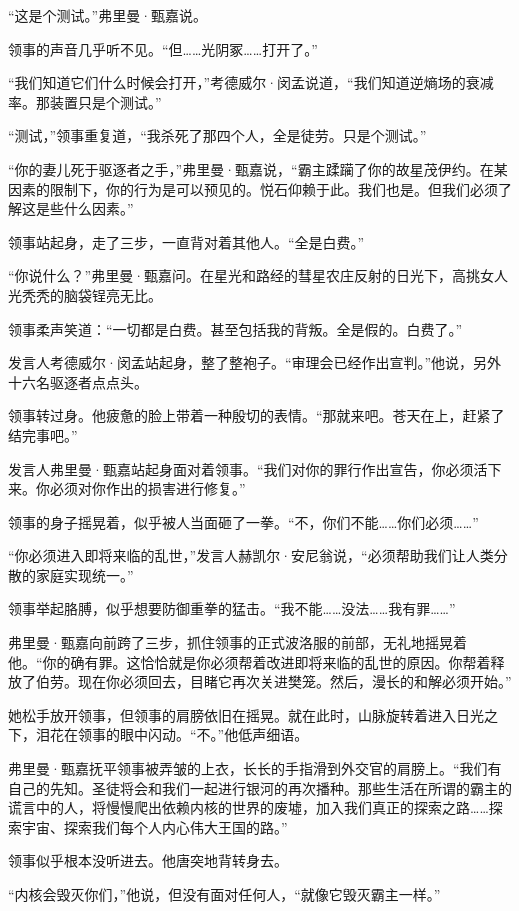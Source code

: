 \documentclass[AutoFakeBold=true]{book}
\begin{document}
``这是个测试。''弗里曼·甄嘉说。

领事的声音几乎听不见。``但……光阴冢……打开了。''

``我们知道它们什么时候会打开，''考德威尔·闵孟说道，``我们知道逆熵场的衰减率。那装置只是个测试。''

``测试，''领事重复道，``我杀死了那四个人，全是徒劳。只是个测试。''

``你的妻儿死于驱逐者之手，''弗里曼·甄嘉说，``霸主蹂躏了你的故星茂伊约。在某因素的限制下，你的行为是可以预见的。悦石仰赖于此。我们也是。但我们必须了解这是些什么因素。''

领事站起身，走了三步，一直背对着其他人。``全是白费。''

``你说什么？''弗里曼·甄嘉问。在星光和路经的彗星农庄反射的日光下，高挑女人光秃秃的脑袋锃亮无比。

领事柔声笑道：``一切都是白费。甚至包括我的背叛。全是假的。白费了。''

发言人考德威尔·闵孟站起身，整了整袍子。``审理会已经作出宣判。''他说，另外十六名驱逐者点点头。

领事转过身。他疲惫的脸上带着一种殷切的表情。``那就来吧。苍天在上，赶紧了结完事吧。''

发言人弗里曼·甄嘉站起身面对着领事。``我们对你的罪行作出宣告，你必须活下来。你必须对你作出的损害进行修复。''

领事的身子摇晃着，似乎被人当面砸了一拳。``不，你们不能……你们必须……''

``你必须进入即将来临的乱世，''发言人赫凯尔·安尼翁说，``必须帮助我们让人类分散的家庭实现统一。''

领事举起胳膊，似乎想要防御重拳的猛击。``我不能……没法……我有罪……''

弗里曼·甄嘉向前跨了三步，抓住领事的正式波洛服的前部，无礼地摇晃着他。``你的确有罪。这恰恰就是你必须帮着改进即将来临的乱世的原因。你帮着释放了伯劳。现在你必须回去，目睹它再次关进樊笼。然后，漫长的和解必须开始。''

她松手放开领事，但领事的肩膀依旧在摇晃。就在此时，山脉旋转着进入日光之下，泪花在领事的眼中闪动。``不。''他低声细语。

弗里曼·甄嘉抚平领事被弄皱的上衣，长长的手指滑到外交官的肩膀上。``我们有自己的先知。圣徒将会和我们一起进行银河的再次播种。那些生活在所谓的霸主的谎言中的人，将慢慢爬出依赖内核的世界的废墟，加入我们真正的探索之路……探索宇宙、探索我们每个人内心伟大王国的路。''

领事似乎根本没听进去。他唐突地背转身去。

``内核会毁灭你们，''他说，但没有面对任何人，``就像它毁灭霸主一样。''
\end{document}

